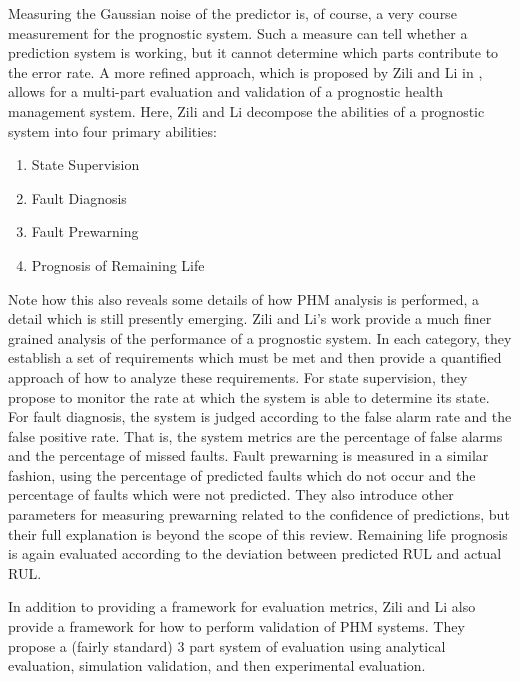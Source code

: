 \documentclass[12pt]{article}
\begin{document}
Measuring the Gaussian noise of the predictor is, of course, a very
course measurement for the prognostic system.  Such a measure can tell
whether a prediction system is working, but it cannot determine which
parts contribute to the error rate.  A more refined approach, which is
proposed by Zili and Li in \cite{5413560}, allows for a multi-part
evaluation and validation of a prognostic health management system.
Here, Zili and Li decompose the abilities of a prognostic system into
four primary abilities:
\begin{enumerate}
  \item State Supervision
  \item Fault Diagnosis
  \item Fault Prewarning
  \item Prognosis of Remaining Life
\end{enumerate}
Note how this also reveals some details of how PHM analysis is
performed, a detail which is still presently emerging.  Zili and Li's
work provide a much finer grained analysis of the performance of a
prognostic system.  In each category, they establish a set of
requirements which must be met and then provide a quantified approach
of how to analyze these requirements.  For state supervision, they
propose to monitor the rate at which the system is able to determine
its state.  For fault diagnosis, the system is judged according to the
false alarm rate and the false positive rate.  That is, the system 
metrics are the percentage of false alarms and the percentage of
missed faults.  Fault prewarning is measured in a similar fashion,
using the percentage of predicted faults which do not occur and the
percentage of faults which were not predicted.  They also introduce
other parameters for measuring prewarning related to the confidence of
predictions, but their full explanation is beyond the scope of this
review.  Remaining life prognosis is again evaluated according to the
deviation between predicted RUL and actual RUL.

In addition to providing a framework for evaluation metrics, Zili and
Li also provide a framework for how to perform validation of PHM
systems.  They propose a (fairly standard) 3 part system of evaluation
using analytical evaluation, simulation validation, and then
experimental evaluation.
\end{document}
